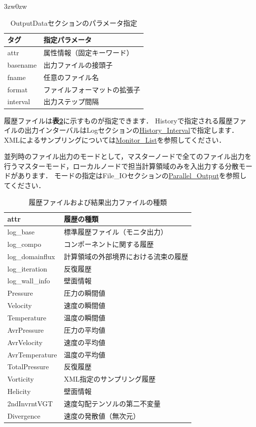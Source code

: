 \begin{indentation}{3zw}{0zw}
\begin{table}[htdp]
\caption{OutputDataセクションのパラメータ指定}
\begin{center}
\small
\begin{tabular}{ll} \toprule
タグ & 指定パラメータ\\ \midrule
attr & 属性情報（固定キーワード）\\
basename & 出力ファイルの接頭子\\
fname & 任意のファイル名\\
format & ファイルフォーマットの拡張子\\
interval & 出力ステップ間隔\\ \bottomrule
\end{tabular}
\end{center}
\label{tbl:outfile}
\end{table}

\pagebreak
履歴ファイルは\textbf{表\ref{tbl:logfile}}に示すものが指定できます．
Historyで指定される履歴ファイルの出力インターバルはLogセクションの\hyperlink{tgt:log}{History\_Interval}で指定します．
XMLによるサンプリングについては\hyperlink{tgt:monitor_list}{Monitor\_List}を参照してください．

並列時のファイル出力のモードとして，マスターノードで全てのファイル出力を行うマスターモード，ローカルノードで担当計算領域のみを入出力する分散モードがあります．
モードの指定はFile\_IOセクションの\hyperlink{tgt:fileio}{Parallel\_Output}を参照してください．

\begin{table}[htdp]
\caption{履歴ファイルおよび結果出力ファイルの種類}
\begin{center}
\small
\begin{tabular}{ll} \toprule
attr & 履歴の種類\\ \midrule
log\_base & 標準履歴ファイル（モニタ出力）\\
log\_compo & コンポーネントに関する履歴\\
log\_domainflux & 計算領域の外部境界における流束の履歴\\
log\_iteration & 反復履歴\\ 
log\_wall\_info & 壁面情報\\
Pressure & 圧力の瞬間値\\
Velocity & 速度の瞬間値\\
Temperature & 温度の瞬間値\\
AvrPressure & 圧力の平均値\\
AvrVelocity & 速度の平均値\\
AvrTemperature & 温度の平均値\\
TotalPressure & 反復履歴\\ 
Vorticity & XML指定のサンプリング履歴\\
Helicity & 壁面情報\\ 
2ndInvrntVGT & 速度勾配テンソルの第二不変量\\ 
Divergence & 速度の発散値（無次元）\\ \bottomrule
\end{tabular}
\end{center}
\label{tbl:logfile}
\end{table}

\end{indentation}
